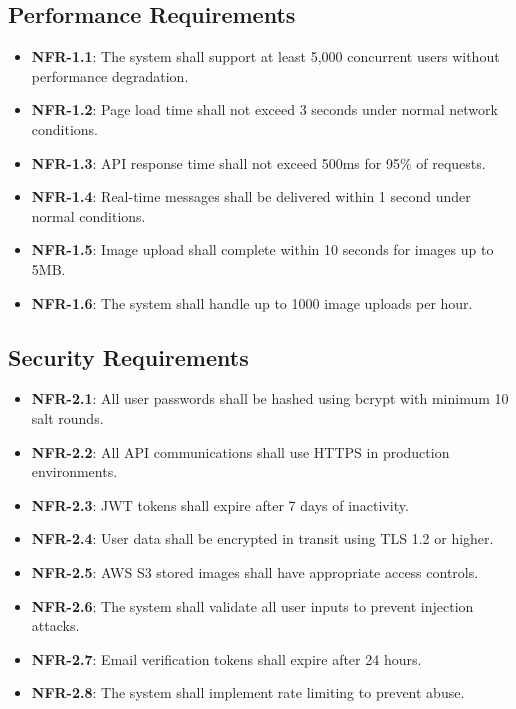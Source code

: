 \documentclass[12pt,a4paper]{article}
\begin{document}
\subsection{Performance Requirements}
\begin{itemize}
    \item \textbf{NFR-1.1}: The system shall support at least 5,000 concurrent users without performance degradation.
    \item \textbf{NFR-1.2}: Page load time shall not exceed 3 seconds under normal network conditions.
    \item \textbf{NFR-1.3}: API response time shall not exceed 500ms for 95\% of requests.
    \item \textbf{NFR-1.4}: Real-time messages shall be delivered within 1 second under normal conditions.
    \item \textbf{NFR-1.5}: Image upload shall complete within 10 seconds for images up to 5MB.
    \item \textbf{NFR-1.6}: The system shall handle up to 1000 image uploads per hour.
\end{itemize}

\subsection{Security Requirements}
\begin{itemize}
    \item \textbf{NFR-2.1}: All user passwords shall be hashed using bcrypt with minimum 10 salt rounds.
    \item \textbf{NFR-2.2}: All API communications shall use HTTPS in production environments.
    \item \textbf{NFR-2.3}: JWT tokens shall expire after 7 days of inactivity.
    \item \textbf{NFR-2.4}: User data shall be encrypted in transit using TLS 1.2 or higher.
    \item \textbf{NFR-2.5}: AWS S3 stored images shall have appropriate access controls.
    \item \textbf{NFR-2.6}: The system shall validate all user inputs to prevent injection attacks.
    \item \textbf{NFR-2.7}: Email verification tokens shall expire after 24 hours.
    \item \textbf{NFR-2.8}: The system shall implement rate limiting to prevent abuse.
\end{itemize}
\end{document}
